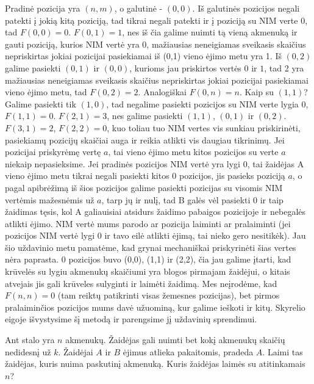 \begin{sprendimas}
Pradinė pozicija yra $(n,m)$, o galutinė - $(0,0)$. Iš galutinės pozicijos negali patekti į jokią kitą poziciją, tad tikrai negali patekti ir į poziciją su NIM verte $0$, tad $F(0,0)=0$. $F(0,1)=1$, 
nes iš čia galime nuimti tą vieną akmenuką ir gauti poziciją, kurios NIM vertė yra 0,  mažiausias neneigiamas sveikasis skaičius nepriskirtas jokiai pozicijai pasiekiamai iš (0,1) vieno ėjimo metu yra 1. 
Iš $(0,2)$ galime pasiekti $(0,1)$ ir $(0,0)$, kurioms jau priskirtos vertės $0$ ir $1$, tad 2 yra mažiausias neneigiamas sveikasis skaičius nepriskirtas jokiai pozicijai pasiekiamai vieno ėjimo metu, tad $F(0,2)=2$. 
Analogiškai $F(0,n)=n$. Kaip su $(1,1)$? Galime pasiekti tik $(1,0)$, tad negalime pasiekti pozicijos su NIM verte lygia 0, $F(1,1)=0$. $F(2,1)=3$,  nes galime pasiekti $(1,1)$, $(0,1)$ ir $(0,2)$. $F(3,1)=2$, $F(2,2)=0$,
kuo toliau tuo NIM vertes vis sunkiau priskirinėti, pasiekiamų pozicijų skaičiai auga ir reikia atlikti vis daugiau tikrinimų. Jei pozicijai priskyrėmę vertę $a$, tai vieno ėjimo metu 
kitos pozicijos su verte $a$ niekaip nepasieksime. Jei pradinės pozicijos NIM vertė yra lygi $0$, tai žaidėjas A vieno ėjimo metu tikrai negali pasiekti kitos 0 pozicijos, jis pasieks poziciją $a$, o pagal apibrėžimą iš šios pozicijos 
galime pasiekti pozicijas su visomis NIM vertėmis mažesnėmis už $a$, tarp jų ir nulį, tad B galės vėl pasiekti 0 ir taip žaidimas tęsis, kol A galiauisiai atsidurs žaidimo pabaigos pozicijoje ir nebegalės atlikti ėjimo. NIM vertė 
mums parodo ar pozicija laiminti ar pralaiminti (jei pozicijos NIM vertė lygi 0 ir tavo eilė atlikti ėjimą, tai nieko gero nesitikėk). Jau šio uždavinio metu pamatėme, kad grynai mechaniškai priskyrinėti šias vertes nėra paprasta. 
0 pozicijos buvo (0,0), (1,1) ir (2,2), čia jau galime įtarti, kad krūvelės su lygiu akmenukų skaičiumi yra blogos pirmajam žaidėjui, o kitais atvejais jis gali krūveles sulyginti ir laimėti žaidimą. Mes neįrodėme, kad 
$F(n,n)=0$ (tam reiktų patikrinti visas žemesnes pozicijas), bet pirmos pralaiminčios pozicijos mums davė užuominą, kur galime ieškoti ir kitų. Skyrelio eigoje išvystysime šį metodą ir parengsime jį uždavinių sprendimui.
\end{sprendimas}

\begin{pav}
  Ant stalo yra $n$ akmenukų. Žaidėjas gali nuimti bet kokį akmenukų skaičių
  nedidesnį už $k$. Žaidėjai $A$ ir $B$ ėjimus atlieka pakaitomis, pradeda $A$.
  Laimi tas žaidėjas, kuris nuima paskutinį akmenuką. Kuris žaidėjas laimės su
  atitinkamais $n$?
\end{pav}

